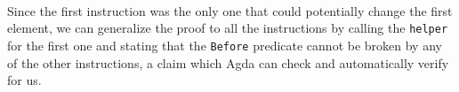 \begin{code}
    \>[0]\AgdaSpace{}%
    \AgdaSymbol{\{}\AgdaSymbol{\}}\AgdaSpace{}%
    \AgdaSymbol{(}\AgdaSpace{}%
    \AgdaOperator{\AgdaInductiveConstructor{,}}\AgdaSpace{}%
    \AgdaSymbol{)}\AgdaSpace{}%
    \AgdaSpace{}%
    \AgdaSymbol{|}\AgdaSpace{}%
    \AgdaSpace{}%
    \AgdaSymbol{=}\AgdaSpace{}%
    \AgdaSpace{}%
    \AgdaSymbol{(}\AgdaSpace{}%
    \AgdaSymbol{)}\<%
    \\
    \>[0]\AgdaSpace{}%
    \AgdaSymbol{\{}\AgdaSymbol{\}}\AgdaSpace{}%
    \AgdaSymbol{(}\AgdaSpace{}%
    \AgdaSpace{}%
    \AgdaOperator{\AgdaInductiveConstructor{,}}\AgdaSpace{}%
    \AgdaSymbol{)}\AgdaSpace{}%
    \AgdaSpace{}%
    \AgdaSymbol{|}\AgdaSpace{}%
    \AgdaSpace{}%
    \AgdaSymbol{\AgdaUnderscore{}}\AgdaSpace{}%
    \AgdaSpace{}%
    \AgdaSpace{}%
    \AgdaSymbol{=}\AgdaSpace{}%
    \AgdaSpace{}%
    \AgdaSymbol{(}\AgdaSpace{}%
    \AgdaSymbol{)}\<%
\end{code}

Since the first instruction was the only one that could potentially change the first element, we can generalize the proof to all the instructions by calling the \verb|helper| for the first one and stating that the \verb|Before| predicate cannot be broken by any of the other instructions, a claim which Agda can check and automatically verify for us.

